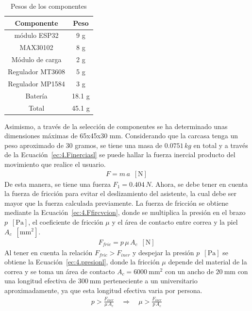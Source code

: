     \begin{table}[H]
    \centering
    \caption{Pesos de los componentes}
    \label{tab:4.pESOS}
    \begin{tabular}{|c|c|} 
    \hline
    Componente       & Peso    \\ 
    \hline
    módulo ESP32     & 9 g     \\ 
    \hline
    MAX30102         & 8 g     \\ 
    \hline
    Módulo de carga  & 2 g     \\ 
    \hline
    Regulador MT3608 & 5 g     \\ 
    \hline
    Regulador MP1584 & 3 g     \\ 
    \hline
    Batería          & 18.1 g  \\ 
    \hhline{|==|}
    Total            & 45.1 g  \\
    \hline
    \end{tabular}
    \end{table}
Asimismo, a través de la selección de componentes se ha determinado unas dimensiones máximas de 65x45x30 mm. Considerando que la carcasa tenga un peso aproximado de 30 gramos, se tiene una masa de $0.0751 \,kg$ en total y a través de la Ecuación~\ref{ec:4.Finerciasl} se puede hallar la fuerza inercial producto del movimiento que realice el usuario.
\begin{align}
\label{ec:4.Finerciasl}
F=m\,a\,\,\,[\si{\newton}]
\end{align}
De esta manera, se tiene una fuerza $F_1 =0.404\,N$. Ahora, se debe tener en cuenta la fuerza de fricción para evitar el deslizamiento del asistente, la cual debe ser mayor que la fuerza calculada previamente. La fuerza de fricción se obtiene mediante la Ecuación~\ref{ec:4.Ffircvcion}, donde  se multiplica la presión en el brazo $p\,\,\,[\si{\pascal}]$, el coeficiente de fricción $\mu$ y el área de contacto entre correa y la piel $A_c\,\,\,[\si{\milli\meter}^2]$.
\begin{align}
\label{ec:4.Ffircvcion}
F_{fric}=p\,\mu \,A_c \,\,\,[\si{\newton}]
\end{align}
Al tener en cuenta la relación $F_{fric}>F_{iner}$ y despejar la presión $p\,\,\,[\si{\pascal}]$ se obtiene la Ecuación~\ref{ec:4.presionl}, donde la fricción $\mu$ depende del material de la correa y se toma un área de contacto $A_c =  \SI{6000}{\milli\meter^2} $ con un ancho de $\SI{20}{\milli\meter}$ con una longitud efectiva de $\SI{300}{\milli\meter}$ perteneciente a un universitario aproximadamente, ya que esta longitud efectiva varia por persona.
\begin{align}
\label{ec:4.presionl}
p>\frac{F_{iner}}{\mu\,A_c} \quad\Rightarrow\quad \mu>\frac{F_{iner}}{p\,A_c}
\end{align}

